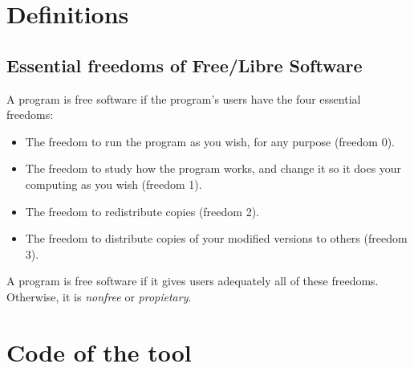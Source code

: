 \documentclass[a4paper, 12pt]{book}
\begin{document}
\chapter{Definitions}
\label{app:definitions}

\section{Essential freedoms of Free/Libre Software}
\label{sec:freedoms}
A program is free software if the program's users have the four essential freedoms:
\begin{itemize}
   \item The freedom to run the program as you wish, for any purpose (freedom 0).
   \item The freedom to study how the program works, and change it so it does your computing as you wish (freedom 1).
   \item The freedom to redistribute copies (freedom 2).
   \item The freedom to distribute copies of your modified versions to others (freedom 3).
\end{itemize}
A program is free software if it gives users adequately all of these freedoms. Otherwise, it is \textit{nonfree} or \textit{propietary}.
\chapter{Code of the tool}
\label{app:code}

\end{document}
